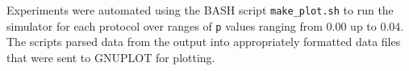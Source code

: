 \documentclass[twocolumn]{article}
\begin{document}
Experiments were automated using the BASH script \verb|make_plot.sh| 
to run the simulator for each protocol over ranges of \verb|p| values ranging
from 0.00 up to 0.04. The scripts parsed data from the output into appropriately
formatted data files that were sent to GNUPLOT for plotting.

    


\end{document}
